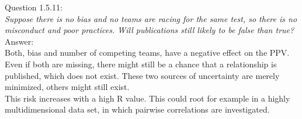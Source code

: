 
Question 1.5.11:\\	
\textsl{Suppose there is no bias and no teams are racing for the same test, so there is no misconduct and poor practices. Will publications still likely to be false than true?}\\

Answer:\\
Both, bias and number of competing teams, have a negative effect on the PPV. Even if both are missing, there might still be a chance that a relationship is published, which does not exist. These two sources of uncertainty are merely minimized, others might still exist.\\

This risk increases with a high R value. This could root for example in a highly multidimensional data set, in which pairwise correlations are investigated.\\
